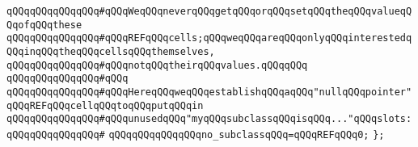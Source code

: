 \verb|qQQqqQQqqQQqqQQq#qQQqWeqQQqneverqQQqgetqQQqorqQQqsetqQQqtheqQQqvalueqQQqofqQQqthese|\newline
\verb|qQQqqQQqqQQqqQQq#qQQqREFqQQqcells;qQQqweqQQqareqQQqonlyqQQqinterestedqQQqinqQQqtheqQQqcellsqQQqthemselves,|\newline
\verb|qQQqqQQqqQQqqQQq#qQQqnotqQQqtheirqQQqvalues.qQQqqQQq|\newline
\verb|qQQqqQQqqQQqqQQq#qQQq|\newline
\verb|qQQqqQQqqQQqqQQq#qQQqHereqQQqweqQQqestablishqQQqaqQQq"nullqQQqpointer"qQQqREFqQQqcellqQQqtoqQQqputqQQqin|\newline
\verb|qQQqqQQqqQQqqQQq#qQQqunusedqQQq"myqQQqsubclassqQQqisqQQq..."qQQqslots:|\newline
\verb|qQQqqQQqqQQqqQQq#|\newline
\verb|qQQqqQQqqQQqqQQqno_subclassqQQq=qQQqREFqQQq0;|\newline
\newline
\verb|};|\newline
\newline

